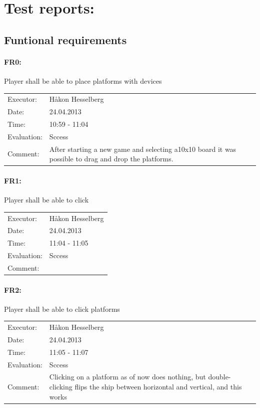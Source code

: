 \documentclass[12pt, a4paper]{article}
\begin{document}
\section{Test reports:}
\subsection{Funtional requirements}
\paragraph{FR0:} Player shall be able to place platforms with devices\\
\begin{tabular}{  p{}  p{} }
	Executor: & Håkon Hesselberg  \\
	Date: & 24.04.2013 \\
	Time: & 10:59 - 11:04  \\
	Evaluation: & Sccess \\
	Comment: & After starting a new game and selecting a10x10 board it was
possible to drag and drop the platforms. \\
\end{tabular}

\paragraph{FR1:} Player shall be able to click \\
\begin{tabular}{  p{}  p{} }
    Executor: & Håkon Hesselberg  \\
    Date: & 24.04.2013 \\
    Time: & 11:04 - 11:05  \\
    Evaluation: & Sccess \\
    Comment: & \\
\end{tabular}

\paragraph{FR2:} Player shall be able to click platforms\\
\begin{tabular}{  p{}  p{} }
    Executor: & Håkon Hesselberg  \\
    Date: & 24.04.2013 \\
    Time: & 11:05 - 11:07  \\
    Evaluation: & Sccess \\
    Comment: & Clicking on a platform as of now does nothing, but
double-clicking flips the ship between horizontal and vertical, and this works \\ 
\end{tabular}
\end{document}
